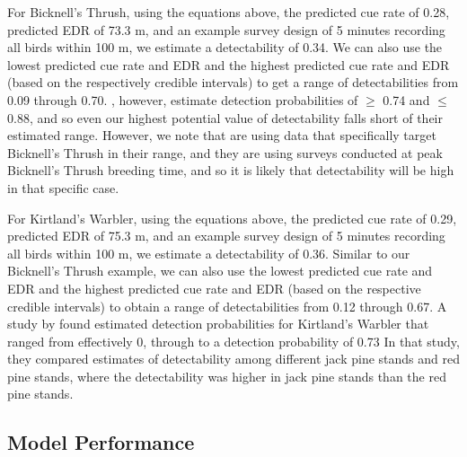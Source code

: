 \documentclass[12pt]{article}
\begin{document}
\par For Bicknell's Thrush, using the equations above, the predicted cue rate of 0.28, predicted EDR of 73.3 m, and an example survey design of 5 minutes recording all birds within 100 m, we estimate a detectability of 0.34.
We can also use the lowest predicted cue rate and EDR and the highest predicted cue rate and EDR (based on the respectively credible intervals) to get a range of detectabilities from 0.09 through 0.70.
\citet{aubry_bicknells_2018}, however, estimate detection probabilities of $\geq$ 0.74 and $\leq$ 0.88, and so even our highest potential value of detectability falls short of their estimated range.
However, we note that \citet{aubry_bicknells_2018} are using data that specifically target Bicknell's Thrush in their range, and they are using surveys conducted at peak Bicknell's Thrush breeding time, and so it is likely that detectability will be high in that specific case.

\par For Kirtland's Warbler, using the equations above, the predicted cue rate of 0.29, predicted EDR of 75.3 m, and an example survey design of 5 minutes recording all birds within 100 m, we estimate a detectability of 0.36.
Similar to our Bicknell's Thrush example, we can also use the lowest predicted cue rate and EDR and the highest predicted cue rate and EDR (based on the respective credible intervals) to obtain a range of detectabilities from 0.12 through 0.67.
A study by \citet{van_dyke_comparative_2022} found estimated detection probabilities for Kirtland’s Warbler that ranged from effectively 0, through to a detection probability of 0.73
In that study, they compared estimates of detectability among different jack pine stands and red pine stands, where the detectability was higher in jack pine stands than the red pine stands.

\subsection{Model Performance}
\end{document}
